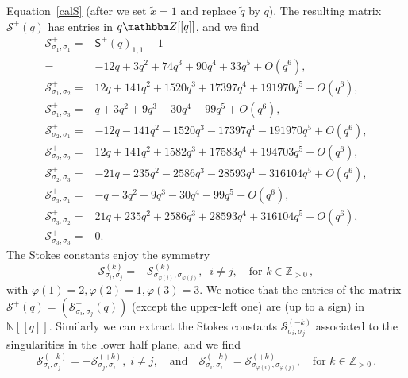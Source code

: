 \documentclass[12pt,reqno]{amsart}
\theoremstyle{definition}
\def\BZ{\mathbbm Z}
\def\IZ{\mathbb{Z}}
\def\s{\sigma}
\def\tq{\tilde{q}}
\def\tx{\tilde{x}}
\def\tx{\tilde{x}}
\def\mc{\mathcal}
\def\ms{\mathsf}
\def\cO{O}
\def\IN{\mathbb{N}}
\def\IZ{\mathbb{Z}}
\newcommand{\nn}{\nonumber \\}
\begin{document}
Equation~\eqref{calS} (after we set $\tx=1$ and replace $\tq$ by $q$).
The resulting matrix $\mc{S}^+(q)$ has entries in $q\BZ[[q]]$, and we
find
\begin{subequations} 
\begin{align}
  \mc{S}^+_{\s_1,\s_1} =
  &\ms{S}^+(q)_{1,1}-1\nn=
  &-12 q+3 q^2+74 q^3+90 q^4+33 q^5+\cO(q^6),\\
  \mc{S}^+_{\s_1,\s_2} =
  &12 q+141 q^2+1520 q^3+17397 q^4+191970 q^5+\cO(q^6),\\
  \mc{S}^+_{\s_1,\s_3} =
  &q+3 q^2+9 q^3+30 q^4+99 q^5+\cO(q^6),\\
  \mc{S}^+_{\s_2,\s_1} =
  &-12 q-141 q^2-1520 q^3-17397 q^4-191970 q^5+\cO(q^6),\\
  \mc{S}^+_{\s_2,\s_2} =
  &12 q+141 q^2+1582 q^3+17583 q^4+194703 q^5+\cO(q^6),\\
  \mc{S}^+_{\s_2,\s_3} =
  &-21 q-235 q^2-2586 q^3-28593 q^4-316104 q^5+\cO(q^6),\\
  \mc{S}^+_{\s_3,\s_1} =
  &-q-3 q^2-9 q^3-30 q^4-99 q^5+\cO(q^6),\\
  \mc{S}^+_{\s_3,\s_2} =
  &21 q+235 q^2+2586 q^3+28593 q^4+316104 q^5+\cO(q^6),\\
  \mc{S}^+_{\s_3,\s_3} =
  &0.
\end{align}
\end{subequations}
The Stokes constants enjoy the symmetry
\begin{equation}
  \mc{S}^{(k)}_{\s_i,\s_j} =
  -\mc{S}^{(k)}_{\s_{\varphi(i)},\s_{\varphi(j)}},\;\; i\neq
  j,\quad \text{for } k\in\IZ_{>0}\,,
\end{equation}
with $\varphi(1)=2,\varphi(2)=1,\varphi(3)=3$.
We notice that the entries of the matrix $\mc{S}^+(q) =
(\mc{S}^+_{\s_i,\s_j}(q))$ (except the upper-left one) are (up to a
sign) in $\IN[[q]]$. Similarly we can extract the Stokes constants
$\mc{S}^{(-k)}_{\s_i,\s_j}$ associated to the singularities in the
lower half plane, and we find
\begin{equation}
  \mc{S}^{(-k)}_{\s_i,\s_j} = - \mc{S}^{(+k)}_{\s_j,\s_i},\;i\neq j,
  \quad\text{and}\quad
  \mc{S}^{(-k)}_{\s_i,\s_i} =
  \mc{S}^{(+k)}_{\s_{\varphi(i)},\s_{\varphi(j)}},\quad
  \text{for } k\in\IZ_{>0}\,.
\end{equation}
\end{document}
